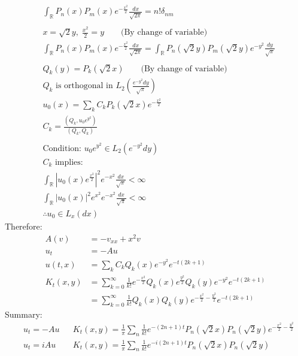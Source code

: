 \documentclass[12pt, a4paper]{article}
\begin{document}
\begin{align*}
    &\int_\mathbb{R}P_n(x)P_m(x)e^{-\frac{x^2}{2}}\frac{dx}{\sqrt{2\pi}} = n!\delta_{nm}\\\\
    &x = \sqrt{2}y, \; \frac{x^2}{2}=y \qquad\text{(By change of variable)}\\
    &\int_\mathbb{R}P_n(x)P_m(x)e^{-\frac{x^2}{2}}\frac{dx}{\sqrt{2\pi}} = \int_\mathbb{R}P_n(\sqrt{2}y)P_m(\sqrt{2}y)e^{-y^2}\frac{dy}{\sqrt{\pi}}\\\\
    &Q_k(y) = P_k(\sqrt{2}x) \qquad\text{(By change of variable)}\\
    &Q_k\text{ is orthogonal in }L_2\left(\frac{e^{-y^2}dy}{\sqrt{\pi}}\right)\\
    &u_0(x)=\sum_kC_kP_k(\sqrt{2}x)e^{-\frac{x^2}{2}}\\
    &C_k = \frac{(Q_k, u_0e^{y^2})}{(Q_k, Q_k)}\\\\
    &\text{Condition: }u_0e^{y^2}\in L_2(e^{-y^2}dy)\\
    &C_k\text{ implies: }\\
    &\int_\mathbb{R}|u_0(x)e^\frac{x^2}{2}|^2e^{-x^2}\frac{dx}{\sqrt{\pi}} < \infty\\
    &\int_\mathbb{R}|u_0(x)|^2e^{x^2}e^{-x^2}\frac{dx}{\sqrt{\pi}} < \infty\\
    &\therefore u_0 \in L_x(dx)
\end{align*}
Therefore:
\begin{align*}
    A(v) &= -v_{xx} + x^2v\\
    u_t &= -Au\\
    u(t, x) &= \sum_k C_kQ_k(x)e^{-y^2}e^{-t(2k+1)}\\
    K_t(x, y) &= \sum_{k=0}^\infty \frac{1}{k!}e^{-\frac{x^2}{2}}Q_k(x)e^{\frac{y^2}{2}}Q_k(y)e^{-y^2}e^{-t(2k+1)}\\
    &= \sum_{k=0}^\infty \frac{1}{k!}Q_k(x)Q_k(y)e^{-\frac{x^2}{2}-\frac{y^2}{2}}e^{-t(2k+1)}
\end{align*}
Summary:
\begin{align*}
    &u_t = -Au && K_t(x, y) = \frac{1}{\pi}\sum_n \frac{1}{k!}e^{-(2n+1)t}P_n(\sqrt{2}x)P_n(\sqrt{2}y)e^{-\frac{x^2}{2}-\frac{y^2}{2}}\\
    &u_t = iAu && K_t(x, y) = \frac{1}{\pi}\sum_n \frac{1}{k!}e^{-i(2n+1)t}P_n(\sqrt{2}x)P_n(\sqrt{2}y)
\end{align*}
\vspace{0.3em}
\end{document}

